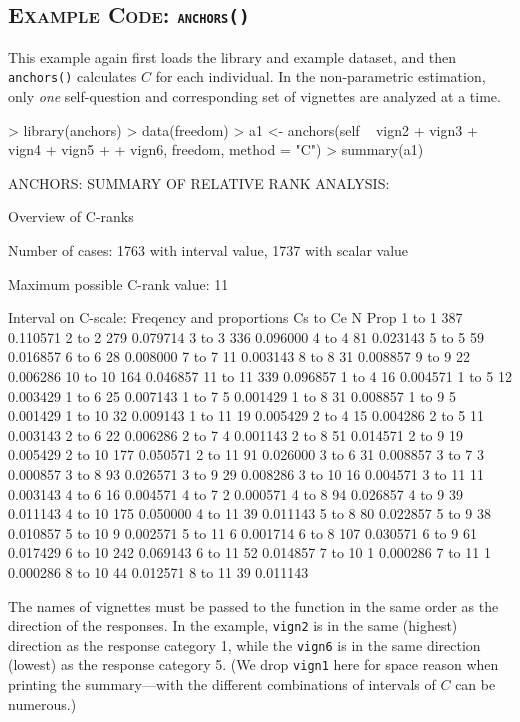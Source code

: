 \documentclass{amsart}
\newcommand{\code}[1]{{\texttt{#1}}}
\newcommand{\ssubsection}[2]{%
  \subsection[#1]{\normalfont\scshape #1: {\tt #2}}}
\begin{document}
\ssubsection{Example Code}{anchors()}
This example again first loads the library and example dataset, and
then \code{anchors()} calculates $C$ for each individual.  In the
non-parametric estimation, only \emph{one} self-question and
corresponding set of vignettes are analyzed at a time.
\begin{Schunk}
\begin{Sinput}
> library(anchors)
> data(freedom)
> a1 <- anchors(self ~ vign2 + vign3 + vign4 + vign5 + 
+     vign6, freedom, method = "C")
> summary(a1)
\end{Sinput}
\begin{Soutput}
ANCHORS: SUMMARY OF RELATIVE RANK ANALYSIS:

Overview of C-ranks

Number of cases: 1763 with interval value, 1737 with scalar value

Maximum possible C-rank value: 11

Interval on C-scale: Freqency and proportions Cs to Ce
           N     Prop
 1 to  1 387 0.110571
 2 to  2 279 0.079714
 3 to  3 336 0.096000
 4 to  4  81 0.023143
 5 to  5  59 0.016857
 6 to  6  28 0.008000
 7 to  7  11 0.003143
 8 to  8  31 0.008857
 9 to  9  22 0.006286
10 to 10 164 0.046857
11 to 11 339 0.096857
 1 to  4  16 0.004571
 1 to  5  12 0.003429
 1 to  6  25 0.007143
 1 to  7   5 0.001429
 1 to  8  31 0.008857
 1 to  9   5 0.001429
 1 to 10  32 0.009143
 1 to 11  19 0.005429
 2 to  4  15 0.004286
 2 to  5  11 0.003143
 2 to  6  22 0.006286
 2 to  7   4 0.001143
 2 to  8  51 0.014571
 2 to  9  19 0.005429
 2 to 10 177 0.050571
 2 to 11  91 0.026000
 3 to  6  31 0.008857
 3 to  7   3 0.000857
 3 to  8  93 0.026571
 3 to  9  29 0.008286
 3 to 10  16 0.004571
 3 to 11  11 0.003143
 4 to  6  16 0.004571
 4 to  7   2 0.000571
 4 to  8  94 0.026857
 4 to  9  39 0.011143
 4 to 10 175 0.050000
 4 to 11  39 0.011143
 5 to  8  80 0.022857
 5 to  9  38 0.010857
 5 to 10   9 0.002571
 5 to 11   6 0.001714
 6 to  8 107 0.030571
 6 to  9  61 0.017429
 6 to 10 242 0.069143
 6 to 11  52 0.014857
 7 to 10   1 0.000286
 7 to 11   1 0.000286
 8 to 10  44 0.012571
 8 to 11  39 0.011143
\end{Soutput}
\end{Schunk}
The names of vignettes must be passed to the function in the same
order as the direction of the responses.  In the example,
\code{vign2} is in the same (highest) direction as the response
category 1, while the \code{vign6} is in the same direction (lowest)
as the response category 5.  (We drop \code{vign1} here for space
reason when printing the summary---with the different combinations of
intervals of $C$ can be numerous.)
\end{document}
